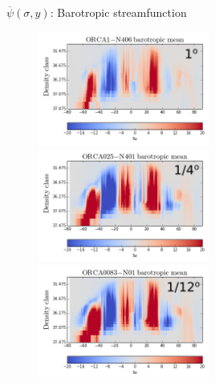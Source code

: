 \documentclass{beamer}
\begin{document}
\begin{frame}{$\overline{\psi}(\sigma, y)$: Barotropic streamfunction}
%  
 \begin{figure}[H]
\centering
\includegraphics[width=0.5\textwidth]{mocsigORCA1_barotMeanStreatchedP.png}
\includegraphics[width=0.5\textwidth]{mocsigORCA025_barotMeanStreatchedP.png}\\
\vspace{-0.2cm}
\includegraphics[width=0.5\textwidth]{mocsigORCA12_barotMeanStreatchedP.png}

\end{figure}
\end{frame}
\end{document}
